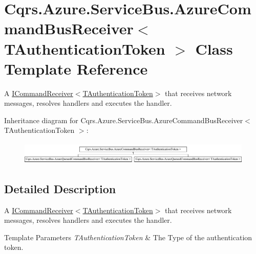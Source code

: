 \hypertarget{classCqrs_1_1Azure_1_1ServiceBus_1_1AzureCommandBusReceiver}{}\section{Cqrs.\+Azure.\+Service\+Bus.\+Azure\+Command\+Bus\+Receiver$<$ T\+Authentication\+Token $>$ Class Template Reference}
\label{classCqrs_1_1Azure_1_1ServiceBus_1_1AzureCommandBusReceiver}


A \hyperlink{interfaceCqrs_1_1Commands_1_1ICommandReceiver}{I\+Command\+Receiver$<$\+T\+Authentication\+Token$>$} that receives network messages, resolves handlers and executes the handler.  


Inheritance diagram for Cqrs.\+Azure.\+Service\+Bus.\+Azure\+Command\+Bus\+Receiver$<$ T\+Authentication\+Token $>$\+:\begin{figure}[H]
\begin{center}
\leavevmode
\includegraphics[height=1.102362cm]{classCqrs_1_1Azure_1_1ServiceBus_1_1AzureCommandBusReceiver}
\end{center}
\end{figure}


\subsection{Detailed Description}
A \hyperlink{interfaceCqrs_1_1Commands_1_1ICommandReceiver}{I\+Command\+Receiver$<$\+T\+Authentication\+Token$>$} that receives network messages, resolves handlers and executes the handler. 


\begin{DoxyTemplParams}{Template Parameters}
{\em T\+Authentication\+Token} & The Type of the authentication token.\\
\hline
\end{DoxyTemplParams}
